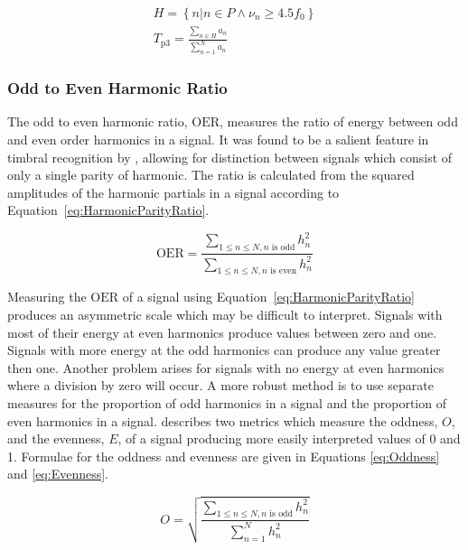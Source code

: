 			\begin{gather}
				H = \left\{ n | n \in P \land \nu_{n} \geq 4.5f_{0} \right\} \nonumber \\
				T_{\mathrm{p}3} = \frac{\sum_{n \in H} a_{n}}{\sum_{n = 1}^{N} a_{n}}
				\label{eq:PeakTristimulus3}
			\end{gather}

		\subsubsection*{Odd to Even Harmonic Ratio}
			The odd to even harmonic ratio, $\mathrm{OER}$, measures the ratio of energy between odd and even
			order harmonics in a signal. It was found to be a salient feature in timbral recognition by
			\citet{hall2010importance}, allowing for distinction between signals which consist of only a single
			parity of harmonic. The ratio is calculated from the squared amplitudes of the harmonic partials in
			a signal according to Equation~\ref{eq:HarmonicParityRatio}.
			
			\begin{equation}
				\mathrm{OER} = \frac{\sum_{1 \leq n \leq N, n \text{ is odd}} h_{n}^{2}}
					       {\sum_{1 \leq n \leq N, n \text{ is even}} h_{n}^{2}}
				\label{eq:HarmonicParityRatio}
			\end{equation}

			Measuring the $\mathrm{OER}$ of a signal using Equation~\ref{eq:HarmonicParityRatio} produces an
			asymmetric scale which may be difficult to interpret.  Signals with most of their energy at even
			harmonics produce values between zero and one.  Signals with more energy at the odd harmonics can
			produce any value greater then one. Another problem arises for signals with no energy at even
			harmonics where a division by zero will occur. A more robust method is to use separate measures for
			the proportion of odd harmonics in a signal and the proportion of even harmonics in a signal.
			\citet{lukasik2005towards} describes two metrics which measure the oddness, $O$, and the evenness,
			$E$, of a signal producing more easily interpreted values of 0 and 1. Formulae for the oddness and
			evenness are given in Equations \ref{eq:Oddness} and \ref{eq:Evenness}.

			\begin{equation}
				O = \sqrt{\frac{\sum_{1 \leq n \leq N, n \text{ is odd}} h_{n}^{2}}
					       {\sum_{n = 1}^{N} h_{n}^{2}}}
				\label{eq:Oddness}
			\end{equation}

